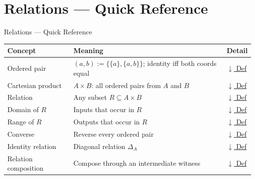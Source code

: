\section{Relations --- Quick Reference}


\begin{toolkitbox}{Relations --- Quick Reference}
\small
\begin{tabular}{l l l}
\toprule
\textbf{Concept} & \textbf{Meaning} & \textbf{Detail} \\
\midrule
Ordered pair     & $(a,b) := \{\{a\},\{a,b\}\}$; identity iff both coords equal  & \hyperref[def:ordered-pair]{$\downarrow$ Def} \\
Cartesian product & $A \times B$: all ordered pairs from $A$ and $B$             & \hyperref[def:cartesian-product-rel]{$\downarrow$ Def} \\
Relation         & Any subset $R \subseteq A \times B$                           & \hyperref[def:relation]{$\downarrow$ Def} \\
Domain of $R$    & Inputs that occur in $R$                                      & \hyperref[def:relation-domain]{$\downarrow$ Def} \\
Range of $R$     & Outputs that occur in $R$                                     & \hyperref[def:relation-range]{$\downarrow$ Def} \\
Converse         & Reverse every ordered pair                                    & \hyperref[def:converse-relation]{$\downarrow$ Def} \\
Identity relation & Diagonal relation $\Delta_A$                                 & \hyperref[def:relation-identity]{$\downarrow$ Def} \\
Relation composition & Compose through an intermediate witness                  & \hyperref[def:relation-composition]{$\downarrow$ Def} \\
\bottomrule
\end{tabular}
\end{toolkitbox}


